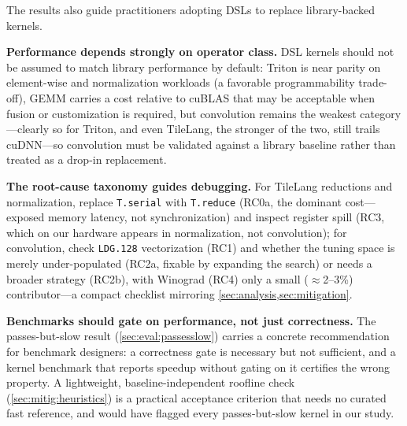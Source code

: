 
The results also guide practitioners adopting DSLs to replace library-backed kernels.

\textbf{Performance depends strongly on operator class.}
DSL kernels should not be assumed to match library performance by default: Triton is near parity on element-wise and normalization workloads (a favorable programmability trade-off), GEMM carries a cost relative to cuBLAS that may be acceptable when fusion or customization is required, but convolution remains the weakest category---clearly so for Triton, and even TileLang, the stronger of the two, still trails cuDNN---so convolution must be validated against a library baseline rather than treated as a drop-in replacement.

\textbf{The root-cause taxonomy guides debugging.}
For TileLang reductions and normalization, replace \texttt{T.serial} with \texttt{T.reduce} (RC0a, the dominant cost---exposed memory latency, not synchronization) and inspect register spill (RC3, which on our hardware appears in normalization, not convolution); for convolution, check \texttt{LDG.128} vectorization (RC1) and whether the tuning space is merely under-populated (RC2a, fixable by expanding the search) or needs a broader strategy (RC2b), with Winograd (RC4) only a small ($\approx$2--3\%) contributor---a compact checklist mirroring \cref{sec:analysis,sec:mitigation}.


\textbf{Benchmarks should gate on performance, not just correctness.}
The passes-but-slow result (\cref{sec:eval:passesslow}) carries a concrete recommendation for benchmark designers: a correctness gate is necessary but not sufficient, and a kernel benchmark that reports speedup without gating on it certifies the wrong property. A lightweight, baseline-independent roofline check (\cref{sec:mitig:heuristics}) is a practical acceptance criterion that needs no curated fast reference, and would have flagged every passes-but-slow kernel in our study.


